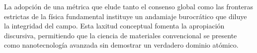 La adopción de una métrica que elude tanto el consenso global como las
fronteras estrictas de la física fundamental instituye un andamiaje
burocrático que diluye la integridad del campo. Esta laxitud conceptual
fomenta la apropiación discursiva, permitiendo que la ciencia de materiales
convencional se presente como nanotecnología avanzada sin demostrar un
verdadero dominio atómico.
